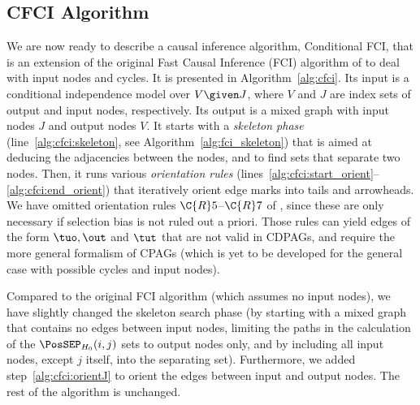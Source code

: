 \subsection{CFCI Algorithm}

We are now ready to describe a causal inference algorithm, Conditional FCI, that is an extension of the original
Fast Causal Inference (FCI) algorithm of \cite{SMR1995} to deal with input nodes and cycles.
It is presented in Algorithm~\ref{alg:cfci}.
Its input is a conditional independence model over $V \given J$, where $V$ and $J$ are index sets of output and input nodes, respectively. 
Its output is a mixed graph with input nodes $J$ and output nodes $V$.
It starts with a \emph{skeleton phase} (line~\ref{alg:cfci:skeleton}, see Algorithm~\ref{alg:fci_skeleton}) that is aimed at deducing the adjacencies between the nodes, and to find sets that separate two nodes.
Then, it runs various \emph{orientation rules} (lines~\ref{alg:cfci:start_orient}--\ref{alg:cfci:end_orient}) that iteratively orient edge marks into tails and arrowheads.
We have omitted orientation rules $\C{R}5$--$\C{R}7$ of \cite{Zhang2008_AI}, since these are only necessary if selection bias is not ruled out a priori. 
Those rules can yield edges of the form $\tuo, \out$ and $\tut$ that are not valid in CDPAGs, and require the more general
formalism of CPAGs (which is yet to be developed for the general case with possible cycles and input nodes).

Compared to the original FCI algorithm \cite{SMR1995} (which assumes no input nodes), 
we have slightly changed the skeleton search phase (by starting with a mixed graph that
contains no edges between input nodes, limiting the paths in the calculation of the
$\PosSEP_{H_0}(i,j)$ sets to output nodes only, and by including all input nodes, 
except $j$ itself, into the separating set). Furthermore, we added 
step~\ref{alg:cfci:orientJ} to orient the edges between input and output nodes. 
The rest of the algorithm is unchanged.

